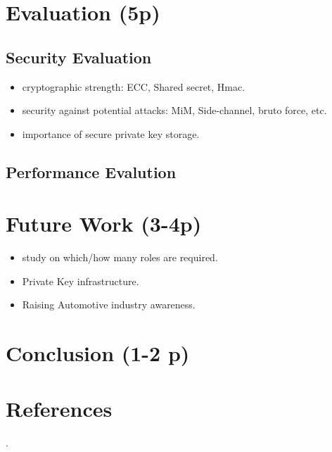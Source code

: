 \documentclass[11pt]{article}
\begin{document}
\section{Evaluation (5p)}
\subsection{Security Evaluation}
\begin{itemize}
	\item cryptographic strength: ECC, Shared secret, Hmac.
	\item security against potential attacks: MiM, Side-channel, bruto force, etc.
	\item importance of secure private key storage.
\end{itemize}

\subsection{Performance Evalution}

\section{Future Work (3-4p)}
\begin{itemize}
	\item study on which/how many roles are required.
	\item Private Key infrastructure.
	\item Raising Automotive industry awareness.
\end{itemize}

\section{Conclusion (1-2 p)}

\section{References}.
\end{document}
